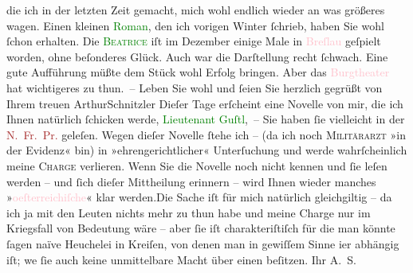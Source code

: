                     die ich in der letzten Zeit gemacht, mich wohl endlich wieder \introOben{}an\introOben{} was größeres {\pb}wagen. Einen
                    kleinen \textcolor{green}{Roman}{}, den ich
                        vorigen Winter{ }ſchrieb, haben Sie wohl ſchon erhalten. Die
                        \textcolor{green}{\textsc{Beatrice}}{}\ledrightnote{\textcolor{green}{Der Schleier der Beatrice. Schauspiel in fünf Akten}} iſt im Dezember einige Male in \textcolor{pink}{Breſlau}{}\ledrightnote{\textcolor{pink}{Breslau}} geſpielt worden, ohne beſonderes Glück. Auch war die
                    Darſtellung recht ſchwach. Eine gute Aufführung müßte dem Stück wohl Erfolg
                    bringen. Aber das \textcolor{pink}{Burgtheater}{}\ledrightnote{\textcolor{pink}{Burgtheater}} hat wichtigeres zu
                    thun. –\pend
           \pstart Leben Sie wohl und ſeien Sie herzlich gegrüßt von Ihrem treuen
                        \spacefill\mbox{ArthurSchnitzler}\pend{}\pstart
           \noindent{}{\pb}Dieſer Tage erſcheint eine Novelle von
                        mir, die ich Ihnen natürlich ſchicken werde, \textcolor{green}{Lieutenant Guſtl}{}\ledrightnote{\textcolor{green}{Lieutenant Gustl. Novelle}}, – Sie haben ſie vielleicht in der \textcolor{brown}{N. Fr. Pr.}{}\ledrightnote{\textcolor{brown}{Neue Freie Presse}} geleſen. Wegen dieſer Novelle
                        ſtehe ich – (da ich noch \textsc{Militärarzt} »in der
                        Evidenz« bin) in »ehrengerichtlicher« Unterſuchung und werde wahrſcheinlich
                        meine \textsc{Charge} verlieren. Wenn Sie die Novelle {\pb}noch nicht kennen und ſie leſen werden –
                        und ſich dieſer Mittheilung erinnern – wird Ihnen wieder manches »\textcolor{pink}{oeſterreichiſche}{}\ledrightnote{\textcolor{pink}{Österreich}}« klar werden.\hspace*{1.5em}Die Sache iſt für mich natürlich gleichgiltig
                        – da ich ja mit den Leuten nichts mehr zu thun habe und meine Charge nur im
                        Kriegsfall von Bedeutung wäre – aber ſie iſt charakteriſtiſch für {\pb}die man könnte ſagen naïve Heuchelei in
                        Kreiſen, von denen man in gewiſſem Sinne i{\geminationm}er
                        abhängig iſt; we{\geminationn}{ }ſie auch keine unmittelbare Macht über
                        einen beſitzen.\pend
           \pstart
           Ihr \spacefill\mbox{A. S.}\pend
           \endnumbering{}  
      